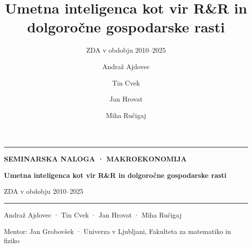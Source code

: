 \documentclass[aspectratio=169,10pt]{beamer}
\title{Umetna inteligenca kot vir R\&R in dolgoročne gospodarske rasti}
\subtitle{ZDA v obdobju 2010--2025}
\author{Andraž Ajdovec \and Tin Cvek \and Jan Hrovat \and Miha Ručigaj}
\begin{document}
\begin{frame}[plain]
\vspace*{6mm}
{\color{hl}\rule{18mm}{1.2mm}}\par\vspace{3mm}
{\color{hl}\footnotesize\bfseries SEMINARSKA NALOGA · MAKROEKONOMIJA}\par\vspace{5mm}
\begin{minipage}{0.9\linewidth}\raggedright
{\color{ink}\fontsize{26}{30}\selectfont\bfseries Umetna inteligenca kot vir R\&R in dolgoročne gospodarske rasti}
\end{minipage}\par\vspace{5mm}
{\color{accent}\Large ZDA v obdobju 2010--2025}\par
\vfill
{\color{rule}\rule{\linewidth}{0.6pt}}\par\vspace{3mm}
{\color{ink}\normalsize Andraž Ajdovec · Tin Cvek · Jan Hrovat · Miha Ručigaj}\par\vspace{1mm}
{\color{muted}\footnotesize Mentor: Jan Grobovšek · Univerza v Ljubljani, Fakulteta za matematiko in fiziko}\par
\vspace*{4mm}
\end{frame}
\end{document}
